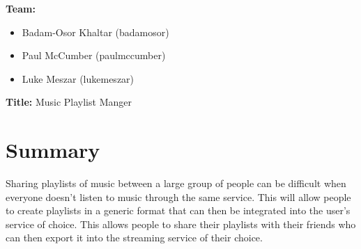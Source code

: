 \documentclass[12pt]{article}
\begin{document}
	\noindent
	\textbf{Team:}
   	 \begin{itemize}[leftmargin=0.0cm,labelsep=0.2cm]
   	 	\item[] Badam-Osor Khaltar (badamosor)
   	 	\item[] Paul McCumber (paulmccumber)
   	 	\item[] Luke Meszar (lukemeszar)
   	 \end{itemize}
    \noindent
    \textbf{Title:} Music Playlist Manger
	\section{Summary}
	Sharing playlists of music between a large group of people can be difficult when
	everyone doesn't listen to music through the same service. This will allow people to create
	playlists in a generic format that can then be integrated into the user’s service of choice. This allows people to share their playlists with their friends who can then export it into the streaming service of their choice. 
\end{document}
